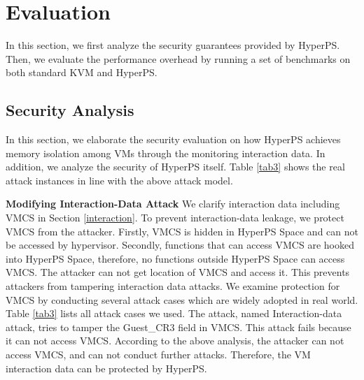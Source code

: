 \section{Evaluation}\label{sec:evaluation}
In this section, we first analyze the security guarantees provided by HyperPS. Then, we evaluate the performance overhead by running a set of benchmarks on both standard KVM and HyperPS.



\subsection{Security Analysis}
 
In this section, we elaborate the security evaluation on how HyperPS achieves memory isolation among VMs through the monitoring interaction data. 
In addition, we analyze the security of HyperPS itself. Table \ref{tab3} shows the real attack instances in line with the above attack model. 



\textbf{Modifying Interaction-Data Attack}
We clarify interaction data including VMCS in Section \ref{interaction}.
To prevent interaction-data leakage, we protect VMCS from the attacker. Firstly, VMCS is hidden in HyperPS Space and can not be accessed by hypervisor. Secondly, functions that can access VMCS are hooked into HyperPS Space, therefore, no functions outside HyperPS Space can access VMCS. The attacker can not get location of VMCS and access it. This prevents attackers from tampering interaction data attacks. We examine protection for VMCS by conducting several attack cases which are widely adopted in real world. Table \ref{tab3} lists all attack cases we used. The attack, named Interaction-data attack, tries to tamper the Guest\_CR3 field in VMCS. This attack fails because it can not access VMCS. 
  According to the above analysis, the attacker can not access VMCS, and can not conduct further attacks. Therefore, the VM interaction data can be protected by HyperPS.


